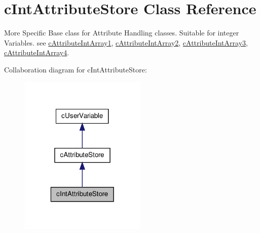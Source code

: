\hypertarget{classc_int_attribute_store}{
\section{cIntAttributeStore Class Reference}
\label{classc_int_attribute_store}
}


More Specific Base class for Attribute Handling classes. Suitable for integer Variables. see \hyperlink{classc_attribute_int_array1}{cAttributeIntArray1}, \hyperlink{classc_attribute_int_array2}{cAttributeIntArray2}, \hyperlink{classc_attribute_int_array3}{cAttributeIntArray3}, \hyperlink{classc_attribute_int_array4}{cAttributeIntArray4}.  




Collaboration diagram for cIntAttributeStore:\nopagebreak
\begin{figure}[H]
\begin{center}
\leavevmode
\includegraphics[width=172pt]{classc_int_attribute_store__coll__graph}
\end{center}
\end{figure}

